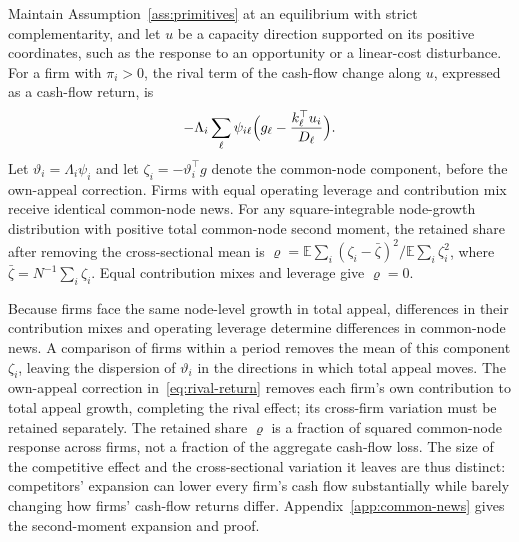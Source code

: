 \begin{proposition}\label{prop:common-news}
  Maintain Assumption~\ref{ass:primitives} at an equilibrium with strict
  complementarity, and let $u$ be a capacity direction supported on its
  positive coordinates, such as the response to an opportunity or a
  linear-cost disturbance.
  For a firm with $\pi_i>0$, the rival term of the cash-flow change along $u$,
  expressed as a cash-flow return, is
  \begin{equation}\label{eq:rival-return}
    -\Lambda_i\sum_\ell\psi_{i\ell}\Bigl(g_\ell-\frac{k_\ell^\top
    u_i}{D_\ell}\Bigr).
  \end{equation}
  Let $\vartheta_i=\Lambda_i\psi_i$ and let
  $\zeta_i=-\vartheta_i^\top g$ denote the common-node component, before the
  own-appeal correction.
  Firms with equal operating leverage and contribution mix receive identical
  common-node news.
  For any square-integrable node-growth distribution with positive total
  common-node second moment, the retained share after removing the
  cross-sectional mean is
  $\varrho=\mathbb E\sum_i(\zeta_i-\bar\zeta)^2/
  \mathbb E\sum_i\zeta_i^2$, where $\bar\zeta=N^{-1}\sum_i\zeta_i$.
  Equal contribution mixes and leverage give $\varrho=0$.
\end{proposition}

Because firms face the same node-level growth in total appeal, differences
in their contribution mixes and operating leverage determine differences in
common-node news.
A comparison of firms within a period removes the mean of this
component $\zeta_i$, leaving the dispersion of $\vartheta_i$ in the directions
in which total appeal moves.
The own-appeal correction in~\eqref{eq:rival-return} removes each firm's own
contribution to total appeal growth, completing the rival effect; its
cross-firm variation must be retained separately.
The retained share $\varrho$ is a fraction of squared common-node response across firms,
not a fraction of the aggregate cash-flow loss.
The size of the competitive effect and the cross-sectional variation it
leaves are thus distinct: competitors' expansion can lower every firm's cash
flow substantially while barely changing how firms' cash-flow returns differ.
Appendix~\ref{app:common-news} gives the second-moment expansion and proof.
